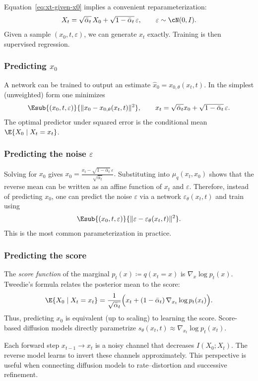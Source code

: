 Equation~\eqref{eq:xt-given-x0} implies a convenient reparameterization:
\begin{equation}
    X_t = \sqrt{\bar\alpha_t}\,X_0 + \sqrt{1-\bar\alpha_t}\,\varepsilon,
    \qquad \varepsilon\sim \cN(0,I).
\end{equation}
Given a sample $(x_0,t,\varepsilon)$, we can generate $x_t$ exactly.
Training is then supervised regression.

\subsubsection*{Predicting $x_0$}

A network can be trained to output an estimate $\widehat x_0 = x_{0,\theta}(x_t,t)$.
In the simplest (unweighted) form one minimizes
\begin{equation}
    \Esub{(x_0,t,\varepsilon)}{\|x_0 - x_{0,\theta}(x_t,t)\|^2},
    \qquad x_t=\sqrt{\bar\alpha_t}x_0+\sqrt{1-\bar\alpha_t}\,\varepsilon.
\end{equation}
The optimal predictor under squared error is the conditional mean $\E{X_0\mid X_t=x_t}$.

\subsubsection*{Predicting the noise $\varepsilon$}

Solving for $x_0$ gives
\(
    x_0 = \frac{x_t-\sqrt{1-\bar\alpha_t}\,\varepsilon}{\sqrt{\bar\alpha_t}}.
\)
Substituting into $\mu_q(x_t,x_0)$ shows that the reverse mean can be written as an affine function of $x_t$ and $\varepsilon$.
Therefore, instead of predicting $x_0$, one can predict the noise $\varepsilon$ via a network $\varepsilon_\theta(x_t,t)$ and train using
\begin{equation}
\label{eq:eps-loss}
    \Esub{(x_0,t,\varepsilon)}{\|\varepsilon - \varepsilon_\theta(x_t,t)\|^2}.
\end{equation}
This is the most common parameterization in practice.

\subsubsection*{Predicting the score}

The \emph{score function} of the marginal $p_t(x)\coloneqq q(x_t=x)$ is
\(\nabla_x\log p_t(x)\).
Tweedie's formula relates the posterior mean to the score:
\begin{equation}
    \E{X_0\mid X_t=x_t}
    = \frac{1}{\sqrt{\bar\alpha_t}}\Bigl(x_t + (1-\bar\alpha_t)\,\nabla_{x_t}\log p_t(x_t)\Bigr).
\end{equation}
Thus, predicting $x_0$ is equivalent (up to scaling) to learning the score.
Score-based diffusion models directly parametrize $s_\theta(x_t,t)\approx \nabla_{x_t}\log p_t(x_t)$.

\begin{remark}
Each forward step $x_{t-1}\to x_t$ is a noisy channel that decreases $I(X_0;X_t)$.
The reverse model learns to invert these channels approximately.
This perspective is useful when connecting diffusion models to rate--distortion and successive refinement.
\end{remark}

